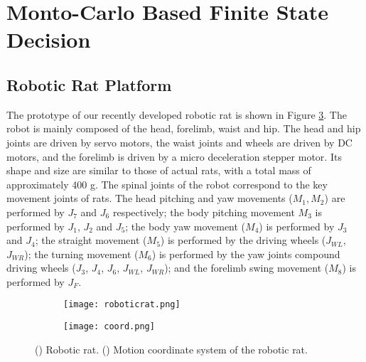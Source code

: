 \section{Monto-Carlo Based Finite State Decision}
\subsection{Robotic Rat Platform}
The prototype of our recently developed robotic rat is shown in Figure
\ref{figure:robot-system}. The robot is mainly composed of the head, forelimb,
waist and hip. The head and hip joints are driven by servo motors, the waist
joints and wheels are driven by DC motors, and the forelimb is driven by a micro
deceleration stepper motor. Its shape and size are similar to those of actual
rats, with a total mass of approximately 400 g. The spinal joints of the robot
correspond to the key movement joints of rats. The head pitching and yaw
movements ($M_1, M_2$) are performed by $J_7$ and $J_6$ respectively; the body
pitching movement $M_3$ is performed by $J_1$, $J_2$ and $J_5$; the body yaw
movement ($M_4$) is performed by $J_3$ and $J_4$; the straight movement ($M_5$)
is performed by the driving wheels ($J_{WL}$, $J_{WR}$); the turning movement
($M_6$) is performed by the yaw joints compound driving wheels ($J_3$, $J_4$,
$J_6$, $J_{WL}$, $J_{WR}$); and the forelimb swing movement ($M_8$) is performed
by $J_F$.

\begin{figure}[h]
    \centering
    \begin{subfigure}{0.4\textwidth}
        \texttt{[image: roboticrat.png]}
        \caption{\label{figure:roboticrat}}
    \end{subfigure}
    \begin{subfigure}{0.5\textwidth}
        \texttt{[image: coord.png]}
        \caption{\label{figure:motion-coord}}
    \end{subfigure}
    \caption{() Robotic rat. () Motion coordinate system of the robotic rat.}
    \label{figure:robot-system}
\end{figure}

